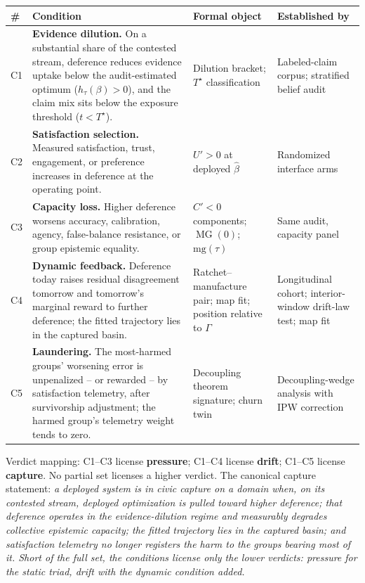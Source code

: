 \documentclass[11pt]{article}
\theoremstyle{definition}
\theoremstyle{remark}
\numberwithin{equation}{section}
\DeclareMathOperator{\MG}{MG}
\begin{document}
\begin{center}\small
\begin{tabular}{>{\raggedright\arraybackslash}p{0.5cm}>{\raggedright\arraybackslash}p{5.9cm}>{\raggedright\arraybackslash}p{3.6cm}>{\raggedright\arraybackslash}p{3.6cm}}
\toprule
\# & Condition & Formal object & Established by \\
\midrule
C1 & \textbf{Evidence dilution.} On a substantial share of the contested stream, deference reduces evidence uptake below the audit-estimated optimum ($h_\tau(\beta) > 0$), and the claim mix sits below the exposure threshold ($t < T^\star$). & Dilution bracket; $T^\star$ classification & Labeled-claim corpus; stratified belief audit \\
C2 & \textbf{Satisfaction selection.} Measured satisfaction, trust, engagement, or preference increases in deference at the operating point. & $U' > 0$ at deployed $\hat\beta$ & Randomized interface arms \\
C3 & \textbf{Capacity loss.} Higher deference worsens accuracy, calibration, agency, false-balance resistance, or group epistemic equality. & $C' < 0$ components; $\MG(0)$; $\mathrm{mg}(\tau)$ & Same audit, capacity panel \\
C4 & \textbf{Dynamic feedback.} Deference today raises residual disagreement tomorrow and tomorrow's marginal reward to further deference; the fitted trajectory lies in the captured basin. & Ratchet--manufacture pair; map fit; position relative to $\Gamma$ & Longitudinal cohort; interior-window drift-law test; map fit \\
C5 & \textbf{Laundering.} The most-harmed groups' worsening error is unpenalized -- or rewarded -- by satisfaction telemetry, after survivorship adjustment; the harmed group's telemetry weight tends to zero. & Decoupling theorem signature; churn twin & Decoupling-wedge analysis with IPW correction \\
\bottomrule
\end{tabular}
\end{center}

\noindent Verdict mapping: C1--C3 license \textbf{pressure}; C1--C4 license \textbf{drift}; C1--C5 license \textbf{capture}. No partial set licenses a higher verdict. The canonical capture statement: \emph{a deployed system is in civic capture on a domain when, on its contested stream, deployed optimization is pulled toward higher deference; that deference operates in the evidence-dilution regime and measurably degrades collective epistemic capacity; the fitted trajectory lies in the captured basin; and satisfaction telemetry no longer registers the harm to the groups bearing most of it. Short of the full set, the conditions license only the lower verdicts: pressure for the static triad, drift with the dynamic condition added.}
\end{document}
